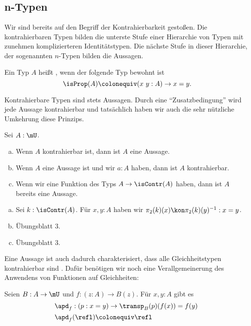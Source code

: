 \subsection{n-Typen}

Wir sind bereits auf den Begriff der Kontrahierbarkeit gestoßen.
Die kontrahierbaren Typen bilden die unterste Stufe einer Hierarchie
von Typen mit zunehmen komplizierteren Identitätstypen.
Die nächste Stufe in dieser Hierarchie, der sogenannten $n$-Typen bilden die Aussagen.

\begin{definition}
  Ein Typ $A$ heißt , wenn der folgende Typ bewohnt ist
  \[
    \isProp(A)\colonequiv (x\ y : A)\to x=y\rlap{.}
  \]
\end{definition}

Kontrahierbare Typen sind stets Aussagen.
Durch eine ``Zusatzbedingung'' wird jede Aussage kontrahierbar und tatsächlich haben wir auch die sehr nützliche Umkehrung diese Prinzips.

\begin{bemerkung}
  Sei $A:\mU$.
  \begin{enumerate}[(a)]
  \item Wenn $A$ kontrahierbar ist, dann ist $A$ eine Aussage.
  \item Wenn $A$ eine Aussage ist und wir $a:A$ haben, dann ist $A$ kontrahierbar.
  \item Wenn wir eine Funktion des Typs $A\to \isContr(A)$ haben, dann ist $A$ bereits eine Aussage. 
  \end{enumerate}
\end{bemerkung}

\begin{beweis}
  \begin{enumerate}[(a)]
  \item Sei $k:\isContr(A)$. Für $x,y:A$ haben wir $\pi_2(k)(x)\kon\pi_2(k)(y)^{-1}:x=y$.
  \item Übungsblatt 3.
  \item Übungsblatt 3.
  \end{enumerate}
\end{beweis}

Eine Aussage ist auch dadurch charakterisiert, dass alle Gleichheitstypen kontrahierbar sind .
Dafür benötigen wir noch eine Verallgemeinerung des Anwendens von Funktionen auf Gleichheiten:

\begin{definition}
  Seien $B:A\to \mU$ und $f:(z:A)\to B(z)$.
  Für $x,y:A$ gibt es
  \begin{align*}
    &\apd_f : (p:x=y) \to \transp_B(p)(f(x))=f(y) \\
    &\apd_f(\refl)\colonequiv \refl
  \end{align*}
\end{definition}

